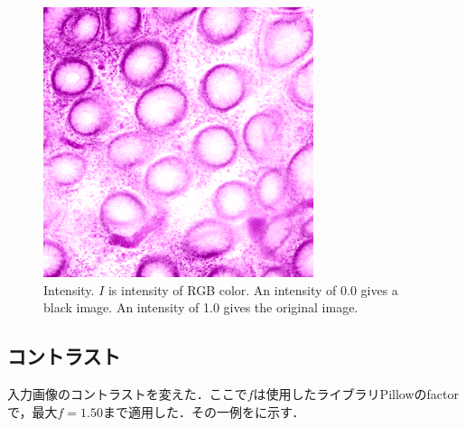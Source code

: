 \begin{figure}[H]
\begin{minipage}{0.25\columnwidth}
	\end{minipage}
	\begin{minipage}{0.25\columnwidth}
		\centering
		\includegraphics[clip, width=\linewidth]{fig/preprocessing/data_aug/color/BRIGHTNESS/BRIGHTNESS_1_20}
	\end{minipage}
	
	\caption{Intensity. $I$ is intensity of RGB color. An intensity of 0.0 gives a black image. An intensity of 1.0 gives the original image.}
	\label{fig:輝度}
	
\end{figure}

\subsection*{コントラスト}
入力画像のコントラストを変えた．ここで$f$は使用したライブラリPillowのfactorで，最大$f=1.50$まで適用した．その一例をに示す．

